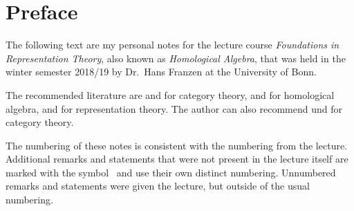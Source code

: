 \chapter{Preface}

The following text are my personal notes for the lecture course \emph{Foundations in Representation Theory}, also known as \emph{Homological Algebra}, that was held in the winter semester 2018/19 by Dr.\ Hans Franzen  at the University of Bonn.

The recommended literature are \cite{Working} and \cite{Schubert} for category theory, \cite[Chapter~1]{SheavesManifolds} and \cite{Weibel} for homological algebra, and \cite{Elements} for representation theory.
The author can also recommend \cite{BasicCategory} und \cite{Brandenburg} for category theory.

The numbering of these notes is consistent with the numbering from the lecture.
Additional remarks and statements that were not present in the lecture itself are marked with the symbol~\textsuperscript{\extrasymbol} and use their own distinct numbering.
Unnumbered remarks and statements were given the lecture, but outside of the usual numbering.




